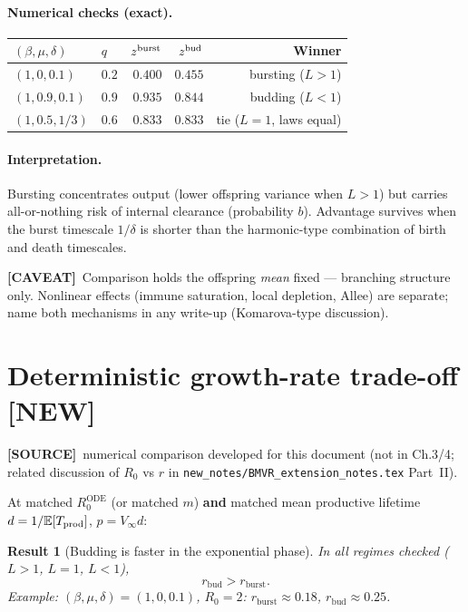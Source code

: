 \documentclass[11pt,a4paper]{article}
\newcommand{\E}{\mathbb{E}}
\theoremstyle{plain}
\newtheorem{result}{Result}[section]
\theoremstyle{definition}
\theoremstyle{remark}
\newcommand{\NEW}{\textcolor{blue!55!black}{\textbf{[NEW]}}}
\newcommand{\CAVEAT}{\textcolor{orange!70!black}{\textbf{[CAVEAT]}}}
\newcommand{\SOURCE}{\textcolor{gray!50!black}{\textbf{[SOURCE]}}}
\begin{document}
\paragraph{Numerical checks (exact).}
\begin{center}
\begin{tabular}{@{}llrrr@{}}
\toprule
$(\beta,\mu,\delta)$ & $q$ & $z^{\rm burst}$ & $z^{\rm bud}$ & Winner \\
\midrule
$(1,0,0.1)$ & $0.2$ & $0.400$ & $0.455$ & bursting ($L>1$) \\
$(1,0.9,0.1)$ & $0.9$ & $0.935$ & $0.844$ & budding ($L<1$) \\
$(1,0.5,1/3)$ & $0.6$ & $0.833$ & $0.833$ & tie ($L=1$, laws equal) \\
\bottomrule
\end{tabular}
\end{center}

\paragraph{Interpretation.}
Bursting concentrates output (lower offspring variance when $L>1$) but carries
all-or-nothing risk of internal clearance (probability $b$). Advantage survives
when the burst timescale $1/\delta$ is shorter than the harmonic-type combination
of birth and death timescales.

\CAVEAT\ Comparison holds the offspring \emph{mean} fixed --- branching
structure only. Nonlinear effects (immune saturation, local depletion, Allee)
are separate; name both mechanisms in any write-up (Komarova-type discussion).

\section{Deterministic growth-rate trade-off \NEW}
\label{sec:r-tradeoff}
\SOURCE\
numerical comparison developed for this document
(not in Ch.3/4; related discussion of $R_0$ vs $r$ in
\texttt{new\_notes/BMVR\_extension\_notes.tex} Part~II).

At matched $R_0^{\mathrm{ODE}}$ (or matched $m$) \textbf{and} matched mean
productive lifetime $d=1/\E[T_{\rm prod}]$, $p=V_\infty d$:

\begin{result}[Budding is faster in the exponential phase]
In all regimes checked ($L>1$, $L=1$, $L<1$),
\[
r_{\mathrm{bud}} > r_{\mathrm{burst}}.
\]
Example: $(\beta,\mu,\delta)=(1,0,0.1)$, $R_0=2$:
$r_{\mathrm{burst}}\approx 0.18$, $r_{\mathrm{bud}}\approx 0.25$.
\end{result}
\end{document}
